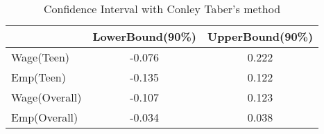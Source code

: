 \begin{table}[htbp]\centering
\caption{Confidence Interval with Conley Taber's method}
\begin{tabular}{l*{2}{c}}
\toprule
            &LowerBound(90\%)&UpperBound(90\%)\\
\midrule
Wage(Teen)  &      -0.076&       0.222\\
Emp(Teen)   &      -0.135&       0.122\\
Wage(Overall)&      -0.107&       0.123\\
Emp(Overall)&      -0.034&       0.038\\
\bottomrule
\end{tabular}
\end{table}
